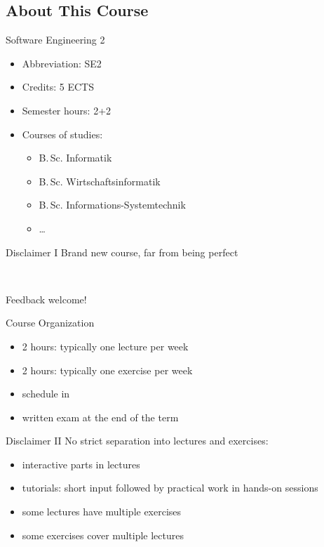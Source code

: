 \subsection{About This Course} 
\begin{frame}{\insertsubsection}
	\begin{fancycolumns}
		\begin{definition}{Software Engineering 2}
			\begin{itemize}
				\item Abbreviation: SE2
				\item Credits: 5 ECTS
				\item Semester hours: 2+2
				\item Courses of studies:
				\begin{itemize}
					\item B.\,Sc.{} Informatik
					\item B.\,Sc.{} Wirtschaftsinformatik
					\item B.\,Sc.{} Informations-Systemtechnik
					\item \ldots
				\end{itemize}
			\end{itemize}
		\end{definition}
		\begin{note}{Disclaimer I}
			Brand new course, far from being perfect
			
			~
			
			Feedback welcome!
		\end{note}
		\nextcolumn
		\begin{definition}{Course Organization}
			\begin{itemize}
				\item 2 hours: typically one lecture per week
				\item 2 hours: typically one exercise per week
				\item schedule in \StudIP
				\item written exam at the end of the term
			\end{itemize}
		\end{definition}
		\begin{note}{Disclaimer II}
			No strict separation into lectures and exercises:
			\begin{itemize}
				\item interactive parts in lectures
				\item tutorials: short input followed by practical work in hands-on sessions
				\item some lectures have multiple exercises
				\item some exercises cover multiple lectures
			\end{itemize}
		\end{note}
	\end{fancycolumns}
\end{frame}

